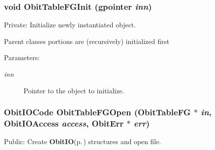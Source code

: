 \subsubsection{\setlength{\rightskip}{0pt plus 5cm}void Obit\-Table\-FGInit (gpointer {\em inn})}\label{ObitTableFG_8c_a8}


Private: Initialize newly instantiated object. 

Parent classes portions are (recursively) initialized first \begin{Desc}
\item[Parameters:]
\begin{description}
\item[{\em inn}]Pointer to the object to initialize. \end{description}
\end{Desc}
\subsubsection{\setlength{\rightskip}{0pt plus 5cm}Obit\-IOCode Obit\-Table\-FGOpen ({\bf Obit\-Table\-FG} $\ast$ {\em in}, Obit\-IOAccess {\em access}, {\bf Obit\-Err} $\ast$ {\em err})}\label{ObitTableFG_8c_a21}


Public: Create {\bf Obit\-IO}{\rm (p.\,\pageref{structObitIO})} structures and open file. 

